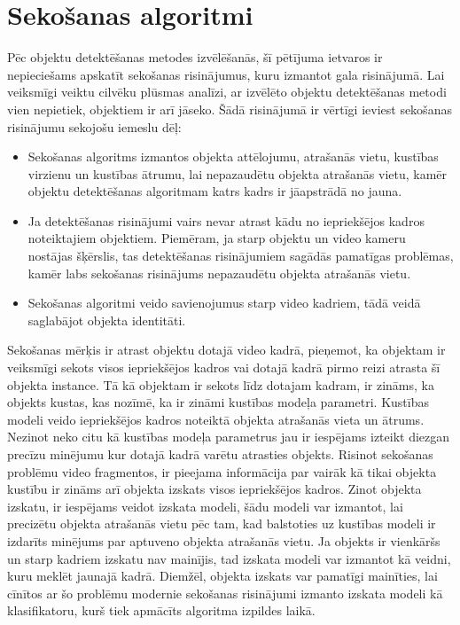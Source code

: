 \section{Sekošanas algoritmi}
Pēc objektu detektēšanas metodes izvēlēšanās, šī pētījuma ietvaros ir nepieciešams apskatīt sekošanas risinājumus, kuru izmantot gala risinājumā. Lai veiksmīgi veiktu cilvēku plūsmas analīzi, ar izvēlēto objektu detektēšanas metodi vien nepietiek, objektiem ir arī jāseko. Šādā risinājumā ir vērtīgi ieviest sekošanas risinājumu sekojošu iemeslu dēļ:
\begin{itemize}
	\item Sekošanas algoritms izmantos objekta attēlojumu, atrašanās vietu, kustības virzienu un kustības ātrumu, lai nepazaudētu objekta atrašanās vietu, kamēr objektu detektēšanas algoritmam katrs kadrs ir jāapstrādā no jauna.
	\item Ja detektēšanas risinājumi vairs nevar atrast kādu no iepriekšējos kadros noteiktajiem objektiem. Piemēram, ja starp objektu un video kameru nostājas šķērslis, tas detektēšanas risinājumiem sagādās pamatīgas problēmas, kamēr labs sekošanas risinājums nepazaudētu objekta atrašanās vietu.
	\item Sekošanas algoritmi veido savienojumus starp video kadriem, tādā veidā saglabājot objekta identitāti.
\end{itemize}

Sekošanas mērķis ir atrast objektu dotajā video kadrā, pieņemot, ka objektam ir veiksmīgi sekots visos iepriekšējos kadros vai dotajā kadrā pirmo reizi atrasta šī objekta instance. Tā kā objektam ir sekots līdz dotajam kadram, ir zināms, ka objekts kustas, kas nozīmē, ka ir zināmi kustības modeļa parametri. Kustības modeli veido iepriekšējos kadros noteiktā objekta atrašanās vieta un ātrums. Nezinot neko citu kā kustības modeļa parametrus jau ir iespējams izteikt diezgan precīzu minējumu kur dotajā kadrā varētu atrasties objekts. Risinot sekošanas problēmu video fragmentos, ir pieejama informācija par vairāk kā tikai objekta kustību ir zināms arī objekta izskats visos iepriekšējos kadros. Zinot objekta izskatu, ir iespējams veidot izskata modeli, šādu modeli var izmantot, lai precizētu objekta atrašanās vietu pēc tam, kad balstoties uz kustības modeli ir izdarīts minējums par aptuveno objekta atrašanās vietu. Ja objekts ir vienkāršs un starp kadriem izskatu nav mainījis, tad izskata modeli var izmantot kā veidni, kuru meklēt jaunajā kadrā. Diemžēl, objekta izskats var pamatīgi mainīties, lai cīnītos ar šo problēmu modernie sekošanas risinājumi izmanto izskata modeli kā klasifikatoru, kurš tiek apmācīts algoritma izpildes laikā. 


